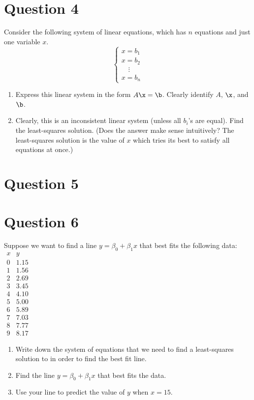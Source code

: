 \documentclass{article}
\begin{document}
\section{Question 4}
	\item Consider the following system of linear equations, which has $n$ equations and just one variable $x$.
	\[\left\{\begin{array}{l}
	x = b_1\\
	x = b_2\\
	\quad \vdots \\
	x = b_n
	\end{array}\right.\]
	\begin{enumerate}
		\item Express this linear system in the form $A\x = \b$.  Clearly identify $A$, $\x$, and $\b$.
		\item Clearly, this is an inconsistent linear system (unless all $b_i$'s are equal).  Find the least-squares solution.  (Does the answer make sense intuitively?  The least-squares solution is the value of $x$ which tries its best to satisfy all equations at once.)
	\end{enumerate}

\section{Question 5}


\section{Question 6}
\item Suppose we want to find a line $y = \beta_0 + \beta_1x$ that best fits the following data:\qquad $\begin{array}{r|r}
	x & y\\
	\hline
	0 & 1.15\\
	1 & 1.56\\
	2 & 2.69\\
	3 & 3.45\\
	4 & 4.10\\
	5 & 5.00\\
	6 & 5.89\\
	7 & 7.03\\
	8 & 7.77\\
	9 & 8.17
	\end{array}$
	\begin{enumerate}
		\item Write down the system of equations that we need to find a least-squares solution to in order to find the best fit line.
		\item Find the line $y = \beta_0 + \beta_1x$ that best fits the data.
		\item Use your line to predict the value of $y$ when $x=15$.
	\end{enumerate}
\end{document}
